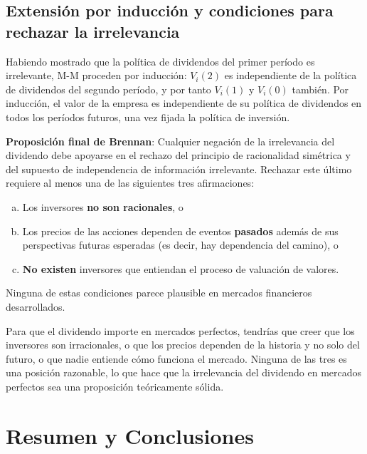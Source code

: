 \documentclass[12pt]{article}
\begin{document}
\subsection{Extensi\'on por inducci\'on y condiciones para rechazar la irrelevancia}

Habiendo mostrado que la pol\'itica de dividendos del primer per\'iodo es irrelevante, M-M proceden por inducci\'on: $V_i(2)$ es independiente de la pol\'itica de dividendos del segundo per\'iodo, y por tanto $V_i(1)$ y $V_i(0)$ tambi\'en. Por inducci\'on, el valor de la empresa es independiente de su pol\'itica de dividendos en todos los per\'iodos futuros, una vez fijada la pol\'itica de inversi\'on.

\begin{explicacion}
\textbf{Proposici\'on final de Brennan}: Cualquier negaci\'on de la irrelevancia del dividendo debe apoyarse en el rechazo del principio de racionalidad sim\'etrica y del supuesto de independencia de informaci\'on irrelevante. Rechazar este \'ultimo requiere al menos una de las siguientes tres afirmaciones:
\begin{enumerate}[(a)]
  \item Los inversores \textbf{no son racionales}, o
  \item Los precios de las acciones dependen de eventos \textbf{pasados} adem\'as de sus perspectivas futuras esperadas (es decir, hay dependencia del camino), o
  \item \textbf{No existen} inversores que entiendan el proceso de valuaci\'on de valores.
\end{enumerate}
Ninguna de estas condiciones parece plausible en mercados financieros desarrollados.
\end{explicacion}

\begin{intuicion}
Para que el dividendo importe en mercados perfectos, tendr\'ias que creer que los inversores son irracionales, o que los precios dependen de la historia y no solo del futuro, o que nadie entiende c\'omo funciona el mercado. Ninguna de las tres es una posici\'on razonable, lo que hace que la irrelevancia del dividendo en mercados perfectos sea una proposici\'on te\'oricamente s\'olida.
\end{intuicion}

\section{Resumen y Conclusiones}
\end{document}
